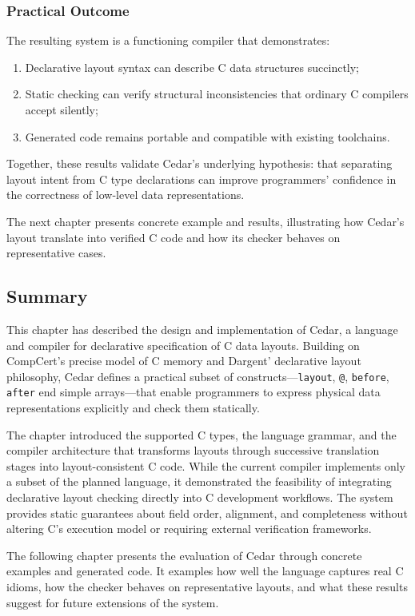 \subsubsection{Practical Outcome}
The resulting system is a functioning compiler that demonstrates:
\begin{enumerate}
    \item Declarative layout syntax can describe C data structures succinctly;
    \item Static checking can verify structural inconsistencies that ordinary
    C compilers accept silently;
    \item Generated code remains portable and compatible with existing toolchains.
\end{enumerate}

Together, these results validate Cedar's underlying hypothesis: that
separating layout intent from C type declarations can improve
programmers' confidence in the correctness of low-level data representations.

The next chapter presents concrete example and results, illustrating how
Cedar's layout translate into verified C code and how its checker behaves
on representative cases.

\subsection{Summary}
This chapter has described the design and implementation of Cedar, a 
language and compiler for declarative specification of C data
layouts. Building on CompCert's precise model of C memory and Dargent'
declarative layout philosophy, Cedar defines a practical subset of
constructs—\texttt{layout}, \texttt{@}, \texttt{before}, \texttt{after}
end simple arrays—that enable programmers to express physical data
representations explicitly and check them statically.

The chapter introduced the supported C types, the language grammar, and the
compiler architecture that transforms layouts through successive translation
stages into layout-consistent C code. While the current compiler implements
only a subset of the planned language, it demonstrated the feasibility
of integrating declarative layout checking directly into C development
workflows.
The system provides static guarantees about field order, alignment,
and completeness without altering C's execution model or
requiring external verification frameworks.

The following chapter presents the evaluation of Cedar through concrete
examples and generated code.
It examples how well the language captures real C idioms, how the
checker behaves on representative layouts, and what these results suggest
for future extensions of the system.

